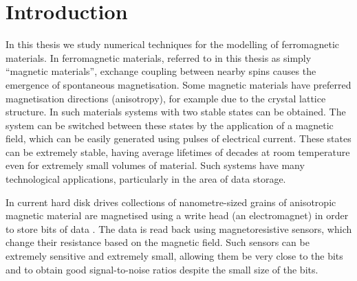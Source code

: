 
\chapter{Introduction}
\label{sec:introduction}


In this thesis we study numerical techniques for the modelling of ferromagnetic materials.
In ferromagnetic materials, referred to in this thesis as simply ``magnetic materials'', exchange coupling between nearby spins causes the emergence of spontaneous magnetisation.
Some magnetic materials have preferred magnetisation directions (anisotropy), for example due to the crystal lattice structure.
In such materials systems with two stable states can be obtained.
The system can be switched between these states by the application of a magnetic field, which can be easily generated using pulses of electrical current.
These states can be extremely stable, having average lifetimes of decades at room temperature even for extremely small volumes of material.
Such systems have many technological applications, particularly in the area of data storage.

In current hard disk drives collections of nanometre-sized grains of anisotropic magnetic material are magnetised using a write head (an electromagnet) in order to store bits of data \cite[Sec. 14.6]{Kronmuller1997}.
The data is read back using magnetoresistive sensors, which change their resistance based on the magnetic field.
Such sensors can be extremely sensitive and extremely small, allowing them be very close to the bits and to obtain good signal-to-noise ratios despite the small size of the bits.

